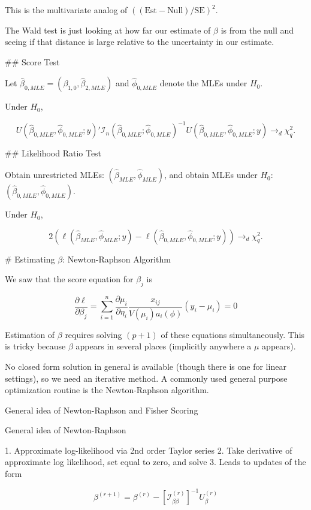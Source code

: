 \documentclass[
  letterpaper,
  DIV=11,
  numbers=noendperiod]{scrreport}
\begin{document}
{This is the multivariate analog of $((\text{Est} - \text{Null})/\text{SE})^2$.

The Wald test is just looking at how far our estimate of $\beta$ is from the 
null and seeing if that distance is large relative to the uncertainty in our 
estimate. 


## Score Test 

Let $\hat \beta_{0,MLE} = (\beta_{1,0}, \hat \beta_{2,MLE})$ and $\hat \phi_{0,MLE}$
denote the MLEs under $H_0$. 

Under $H_0$, 

$$U(\hat \beta_{0,MLE}, \hat \phi_{0,MLE}; y)' \mathcal I_n(\hat \beta_{0,MLE}; \hat \phi_{0, MLE})^{-1} U(\hat \beta_{0,MLE}, \hat \phi_{0,MLE}; y) \longrightarrow_d \chi^2_q.$$

## Likelihood Ratio Test 

Obtain unrestricted MLEs: $(\hat \beta_{MLE}, \hat \phi_{MLE})$, and obtain MLEs under 
$H_0:$ $(\hat \beta_{0, MLE}, \hat \phi_{0,MLE})$. 

Under $H_0$,

$$2(\ell(\hat \beta_{MLE}, \hat \phi_{MLE}; y) - \ell(\hat \beta_{0,MLE}, \hat \phi_{0, MLE} ; y)) \longrightarrow_d \chi^2_q.$$

# Estimating $\beta$: Newton-Raphson Algorithm

We saw that the score equation for $\beta_j$ is 

$$\frac{\partial \ell}{\partial \beta_j} = \sum_{i=1}^n \frac{\partial \mu_i}{\partial \eta_i} \frac{x_{ij}}{V(\mu_i) a_i(\phi)} (y_i - \mu_i) = 0$$

Estimation of $\beta$ requires solving $(p+1)$ of these equations simultaneously. This is tricky because $\beta$ appears in several places 
(implicitly anywhere a $\mu$ appears). 

No closed form solution in general is available (though there is one
for linear settings), so we need an iterative method. A commonly used 
general purpose optimization routine is the Newton-Raphson algorithm. 

General idea of Newton-Raphson and Fisher Scoring 

General idea of Newton-Raphson 

1. Approximate log-likelihood via 2nd order Taylor series 
2. Take derivative of approximate log likelihood, set equal to zero, and solve
3. Leads to updates of the form 

$$\beta^{(r+1)} = \beta^{(r)} - \left[ \mathcal{I}_{\beta \beta}^{(r)}\right]^{-1} U^{(r)}_{\beta}$$

}
\end{document}
